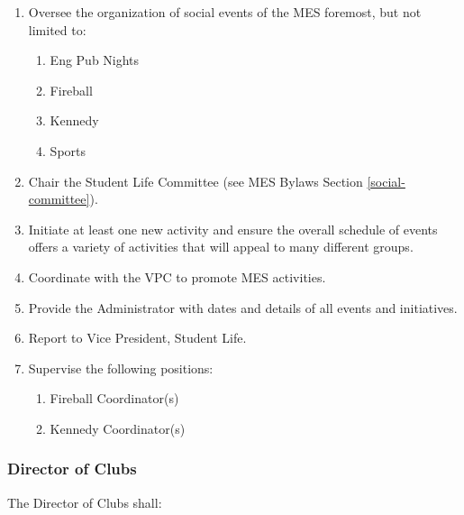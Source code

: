 \begin{enumerate}
 \item
  Oversee the organization of social events of the MES foremost, but not limited to:

  \begin{enumerate}
   \item
    Eng Pub Nights
   \item
    Fireball
   \item
    Kennedy
   \item
    Sports
  \end{enumerate}
 \item
  Chair the Student Life Committee (see MES Bylaws Section \ref{social-committee}).
 \item
  Initiate at least one new activity and ensure the overall schedule of events offers a variety of activities that will appeal to many different groups.
 \item
  Coordinate with the VPC to promote MES activities.
 \item
  Provide the Administrator with dates and details of all events and initiatives.
 \item
  Report to Vice President, Student Life.
 \item
  Supervise the following positions:

  \begin{enumerate}
   \item
    Fireball Coordinator(s)
   \item
    Kennedy Coordinator(s)

  \end{enumerate}
\end{enumerate}

\subsubsection{Director of Clubs}
\label{director-of-clubs}
The Director of Clubs shall:

